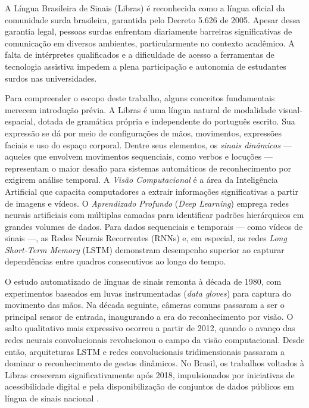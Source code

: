 
A Língua Brasileira de Sinais (Libras) é reconhecida como a língua oficial da comunidade surda brasileira, garantida pelo Decreto 5.626 de 2005. Apesar dessa garantia legal, pessoas surdas enfrentam diariamente barreiras significativas de comunicação em diversos ambientes, particularmente no contexto acadêmico. A falta de intérpretes qualificados e a dificuldade de acesso a ferramentas de tecnologia assistiva impedem a plena participação e autonomia de estudantes surdos nas universidades.

Para compreender o escopo deste trabalho, alguns conceitos fundamentais merecem introdução prévia. A Libras é uma língua natural de modalidade visual-espacial, dotada de gramática própria e independente do português escrito. Sua expressão se dá por meio de configurações de mãos, movimentos, expressões faciais e uso do espaço corporal. Dentre seus elementos, os \textit{sinais dinâmicos} — aqueles que envolvem movimentos sequenciais, como verbos e locuções — representam o maior desafio para sistemas automáticos de reconhecimento por exigirem análise temporal. A \textit{Visão Computacional} é a área da Inteligência Artificial que capacita computadores a extrair informações significativas a partir de imagens e vídeos. O \textit{Aprendizado Profundo} (\textit{Deep Learning}) emprega redes neurais artificiais com múltiplas camadas para identificar padrões hierárquicos em grandes volumes de dados. Para dados sequenciais e temporais — como vídeos de sinais —, as Redes Neurais Recorrentes (RNNs) e, em especial, as redes \textit{Long Short-Term Memory} (LSTM) demonstram desempenho superior ao capturar dependências entre quadros consecutivos ao longo do tempo.

O estudo automatizado de línguas de sinais remonta à década de 1980, com experimentos baseados em luvas instrumentadas (\textit{data gloves}) para captura do movimento das mãos. Na década seguinte, câmeras comuns passaram a ser o principal sensor de entrada, inaugurando a era do reconhecimento por visão. O salto qualitativo mais expressivo ocorreu a partir de 2012, quando o avanço das redes neurais convolucionais revolucionou o campo da visão computacional. Desde então, arquiteturas LSTM e redes convolucionais tridimensionais passaram a dominar o reconhecimento de gestos dinâmicos. No Brasil, os trabalhos voltados à Libras cresceram significativamente após 2018, impulsionados por iniciativas de acessibilidade digital e pela disponibilização de conjuntos de dados públicos em língua de sinais nacional \cite{dockens:18}.

